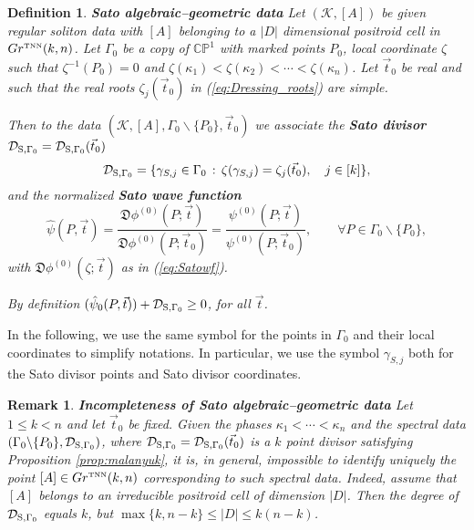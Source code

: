 \documentclass[11pt]{amsart}
\theoremstyle{plain}
\numberwithin{equation}{section}
\newtheorem{remark}{Remark}[subsection]
\newtheorem{definition}{Definition}[subsection]
\def \GTNN {{Gr^{\mbox{\tiny TNN}} (k,n)}}
\def \DS {{\mathcal D}_{\textup{\scriptsize S},\Gamma_0}}
\begin{document}
\begin{definition}\label{def:Sato_data}\textbf{Sato algebraic--geometric data} Let $({\mathcal K}, [A])$ be given regular soliton data with $[A]$ belonging to a $|D|$ dimensional positroid cell in $\GTNN$.  Let $\Gamma_0$ be a copy of $\mathbb{CP}^1$ with marked points $P_0$, local coordinate $\zeta$ such that $\zeta^{-1} (P_0)=0$ and $\zeta(\kappa_1)<\zeta(\kappa_2)<\cdots<\zeta(\kappa_n)$. Let $\vec t_0$ be real and such that the real roots $\zeta_j (\vec t_0)$ in (\ref{eq:Dressing_roots}) are simple.

Then to the data $({\mathcal K}, [A], \Gamma_0\backslash \{ P_0	\} ,\vec t_0)$ we associate the \textbf{Sato divisor} $\DS=\DS(\vec t_0)$
\begin{equation}\label{eq:Satodiv}
\DS=\{ \gamma_{S,j} \in \Gamma_0 \, : \, \zeta(\gamma_{S,j})= \zeta_j (\vec t_0), \quad j\in [k]\},
\end{equation}
and the normalized \textbf{Sato wave function}
\begin{equation}\label{eq:SatoDN}
{\hat \psi } (P, \vec t) = \frac{{\mathfrak D}\phi^{(0)} (P; \vec t)}{{\mathfrak D}\phi^{(0)} (P; \vec t_0)} = \frac{\psi^{(0)} (P; \vec t)}{\psi^{(0)} (P; \vec t_0)}, \quad\quad \forall P\in \Gamma_0\backslash \{ P_0\},
\end{equation}
with ${\mathfrak D}\phi^{(0)} (\zeta; \vec t)$ as in (\ref{eq:Satowf}). 

By definition $({\hat \psi}_0 (P,\vec t)) + \DS \ge 0$, for all $\vec t$.
\end{definition}

In the following, we use the same symbol for the points in $\Gamma_0$ and their local coordinates to simplify notations. In particular, we use the symbol $\gamma_{S,j}$ both for the Sato divisor points and Sato divisor coordinates.

\begin{remark}\label{rem:fundam}\textbf{Incompleteness of Sato algebraic--geometric data} 
Let $1\le k<n$ and let $\vec t_0$ be fixed. Given the phases $\kappa_1<\cdots <\kappa_n$ and the spectral data $( \Gamma_0\backslash \{ P_0	\} , \DS) $, where $\DS=\DS(\vec t_0) $ is a $k$ point divisor satisfying Proposition \ref{prop:malanyuk}, it is, in general, impossible to identify uniquely the point $[A]\in \GTNN$ corresponding to such spectral data. Indeed, assume that $[A]$ belongs to an irreducible positroid cell of dimension $|D|$. Then the degree of $\DS$ equals $k$, but $\max\{k, n-k\} \le |D| \le k(n-k)$.
\end{remark}
\end{document}
